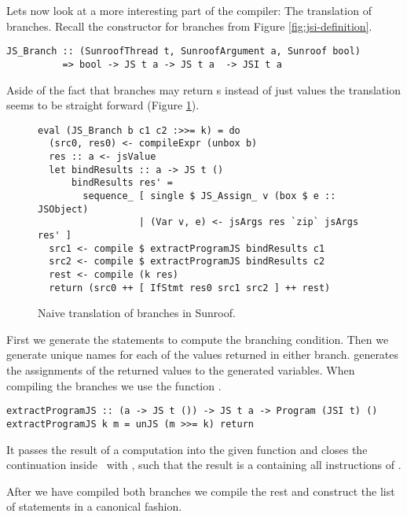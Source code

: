 Lets now look at a more interesting part of the compiler: The translation of 
branches.
Recall the \JSI constructor for branches from Figure \ref{fig:jsi-definition}.
\begin{verbatim}
JS_Branch :: (SunroofThread t, SunroofArgument a, Sunroof bool) 
          => bool -> JS t a -> JS t a  -> JSI t a
\end{verbatim}
Aside of the fact that branches may return s
instead of just  values the translation seems to 
be straight forward (Figure \ref{fig:branch-translation}).
\begin{figure}[h]
\begin{verbatim}
eval (JS_Branch b c1 c2 :>>= k) = do
  (src0, res0) <- compileExpr (unbox b)
  res :: a <- jsValue
  let bindResults :: a -> JS t ()
      bindResults res' =
        sequence_ [ single $ JS_Assign_ v (box $ e :: JSObject)
                  | (Var v, e) <- jsArgs res `zip` jsArgs res' ]
  src1 <- compile $ extractProgramJS bindResults c1
  src2 <- compile $ extractProgramJS bindResults c2
  rest <- compile (k res)
  return (src0 ++ [ IfStmt res0 src1 src2 ] ++ rest)
\end{verbatim}
\caption{Naive translation of branches in Sunroof.}
\label{fig:branch-translation}
\end{figure}
First we generate the statements to compute the branching condition.
Then we generate unique names for each of the values returned in 
either branch.  generates the assignments of
the returned values to the generated variables. When compiling 
the branches we use the function .
\begin{verbatim}
extractProgramJS :: (a -> JS t ()) -> JS t a -> Program (JSI t) ()
extractProgramJS k m = unJS (m >>= k) return
\end{verbatim}
It passes the result of a computation  
into the given function  and
closes the continuation inside \JS~with ,
such that the result is a  containing
all instructions of .

After we have compiled both branches we compile the rest and
construct the list of statements in a canonical fashion.


